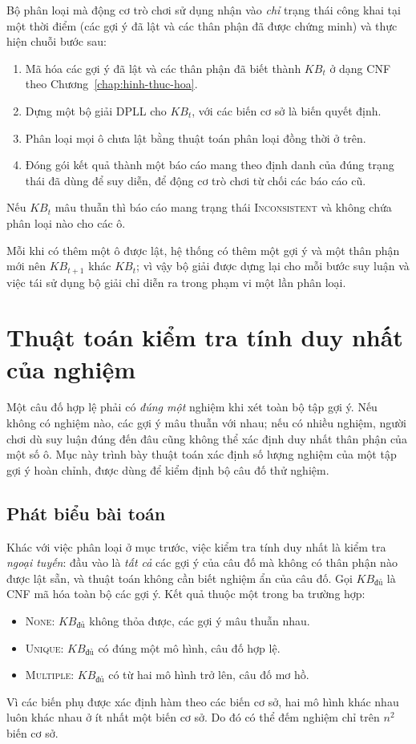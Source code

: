 Bộ phân loại mà động cơ trò chơi sử dụng nhận vào \emph{chỉ} trạng thái công khai tại một thời điểm (các gợi ý đã lật và các thân phận đã được chứng minh) và thực hiện chuỗi bước sau:
\begin{enumerate}
    \item Mã hóa các gợi ý đã lật và các thân phận đã biết thành $KB_t$ ở dạng CNF theo Chương~\ref{chap:hinh-thuc-hoa}.
    \item Dựng một bộ giải DPLL cho $KB_t$, với các biến cơ sở là biến quyết định.
    \item Phân loại mọi ô chưa lật bằng thuật toán phân loại đồng thời ở trên.
    \item Đóng gói kết quả thành một báo cáo mang theo định danh của đúng trạng thái đã dùng để suy diễn, để động cơ trò chơi từ chối các báo cáo cũ.
\end{enumerate}
Nếu $KB_t$ mâu thuẫn thì báo cáo mang trạng thái \textsc{Inconsistent} và không chứa phân loại nào cho các ô.

Mỗi khi có thêm một ô được lật, hệ thống có thêm một gợi ý và một thân phận mới nên $KB_{t+1}$ khác $KB_t$; vì vậy bộ giải được dựng lại cho mỗi bước suy luận và việc tái sử dụng bộ giải chỉ diễn ra trong phạm vi một lần phân loại.
\section{Thuật toán kiểm tra tính duy nhất của nghiệm}
\label{sec:kiem-tra-tinh-duy-nhat}

Một câu đố hợp lệ phải có \emph{đúng một} nghiệm khi xét toàn bộ tập gợi ý. Nếu không có nghiệm nào, các gợi ý mâu thuẫn với nhau; nếu có nhiều nghiệm, người chơi dù suy luận đúng đến đâu cũng không thể xác định duy nhất thân phận của một số ô. Mục này trình bày thuật toán xác định số lượng nghiệm của một tập gợi ý hoàn chỉnh, được dùng để kiểm định bộ câu đố thử nghiệm.

\subsection{Phát biểu bài toán}
\label{subsec:phat-bieu-duy-nhat}

Khác với việc phân loại ở mục trước, việc kiểm tra tính duy nhất là kiểm tra \emph{ngoại tuyến}: đầu vào là \emph{tất cả} các gợi ý của câu đố mà không có thân phận nào được lật sẵn, và thuật toán không cần biết nghiệm ẩn của câu đố. Gọi $KB_{\text{đủ}}$ là CNF mã hóa toàn bộ các gợi ý. Kết quả thuộc một trong ba trường hợp:
\begin{itemize}
    \item \textsc{None}: $KB_{\text{đủ}}$ không thỏa được, các gợi ý mâu thuẫn nhau.
    \item \textsc{Unique}: $KB_{\text{đủ}}$ có đúng một mô hình, câu đố hợp lệ.
    \item \textsc{Multiple}: $KB_{\text{đủ}}$ có từ hai mô hình trở lên, câu đố mơ hồ.
\end{itemize}
Vì các biến phụ được xác định hàm theo các biến cơ sở, hai mô hình khác nhau luôn khác nhau ở ít nhất một biến cơ sở. Do đó có thể đếm nghiệm chỉ trên $n^2$ biến cơ sở.

